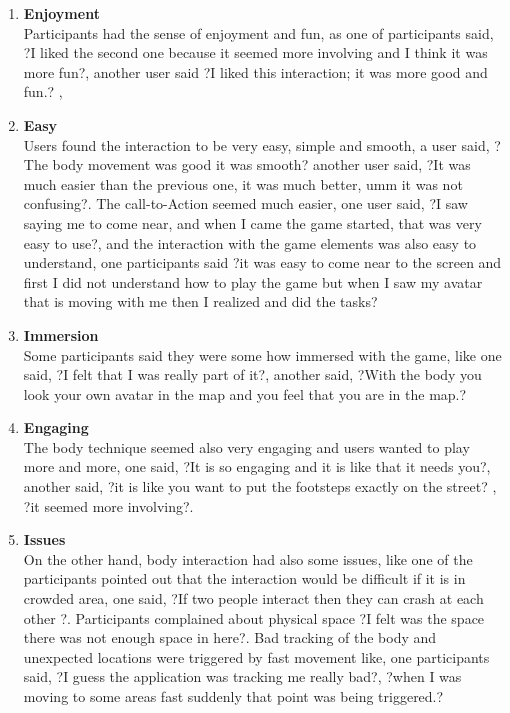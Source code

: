\begin{enumerate}
\item	\textbf{Enjoyment}\\
Participants had the sense of enjoyment and fun, as one of participants said, ?I liked the second one because it seemed more involving and I think it was more fun?, another user said ?I liked this interaction; it was more good and fun.? , 

\item	\textbf{Easy}\\
Users found the interaction to be very easy, simple and smooth, a user said, ?The body movement was good it was smooth? another user said, ?It was much easier than the previous one, it was much better, umm it was not confusing?. The call-to-Action seemed much easier, one user said, ?I saw saying me to come near, and when I came the game started, that was very easy to use?, and the interaction with the game elements was also easy to understand, one participants said ?it was easy to come near to the screen and first I did not understand how to play the game but when I saw my avatar that is moving with me then I realized and did the tasks?

\item	\textbf{Immersion}\\
Some participants said they were some how immersed with the game, like one said, ?I felt that I was really part of it?, another said, ?With the body you look your own avatar in the map and you feel that you are in the map.?

\item	\textbf{Engaging}\\
The body technique seemed also very engaging and users wanted to play more and more, one said, ?It is so engaging and it is like that it needs you?, another said, ?it is like you want to put the footsteps exactly on the street? , ?it seemed more involving?. 

\item	\textbf{Issues}\\
On the other hand, body interaction had also some issues, like one of the participants pointed out that the interaction would be difficult if it is in crowded area, one said, ?If two people interact then they can crash at each other ?. Participants complained about physical space ?I felt was the space there was not enough space in here?. Bad tracking of the body and unexpected locations were triggered by fast movement like, one participants said, ?I guess the application was tracking me really bad?, ?when I was moving to some areas fast suddenly that point was being triggered.? 


\end{enumerate}
